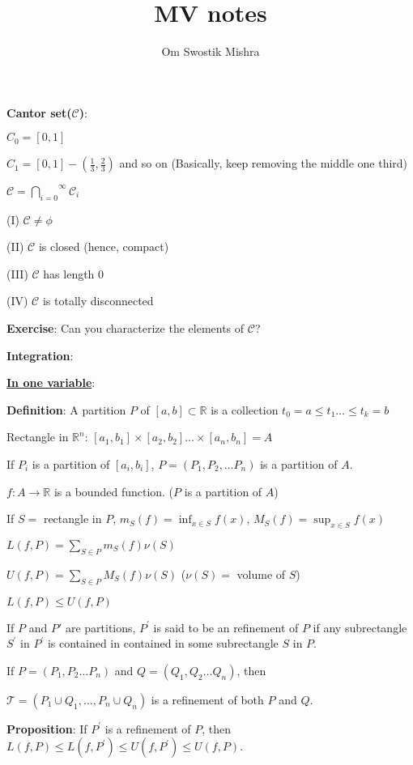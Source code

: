 \documentclass{article}
\title{MV notes}
\author{Om Swostik Mishra}
\date{}
\begin{document}
\maketitle

\begin{flushleft}
\textbf{Cantor set($\mathscr{C}$)}:     

$C_0=[0,1]$

$C_1=[0,1]-(\frac{1}{3},\frac{2}{3})$ and so on (Basically, keep removing the middle one third)

$\mathscr{C}=\overset{\infty}{\underset{i=0}{\bigcap}} \mathcal{C}_i$

(I) $\mathscr{C}\neq \phi$

(II) $\mathscr{C}$ is closed (hence, compact)

(III) $\mathscr{C}$ has length 0

(IV) $\mathscr{C}$ is totally disconnected

\textbf{Exercise}: Can you characterize the elements of $\mathscr{C}$?

\textbf{Integration}:

\underline{\textbf{In one variable}}:

\textbf{Definition}: A partition $P$ of $[a,b]\subset\mathds{R}$ is a collection $t_0=a\leq t_1\dots \leq t_k=b$

Rectangle in $\mathds{R}^n$: $[a_1,b_1]\times [a_2,b_2]\dots \times[a_n,b_n]=A$

If $P_i$ is a partition of $[a_i,b_i]$, $P=(P_1,P_2,\dots P_n)$ is a partition of $A$.

$f:A\rightarrow \mathds{R}$ is a bounded function. ($P$ is a partition of $A$)

If $S=$ rectangle in $P$, $m_S(f)=\inf_{x\in S} f(x)$, $M_S(f)=\sup_{x\in S} f(x)$

$L(f,P)=\sum_{S\in P}^{} m_S(f)\nu(S)$

$U(f,P)=\sum_{S\in P}^{} M_S(f)\nu(S)$  ($\nu(S)=$ volume of $S$)

$L(f,P)\leq U(f,P)$ 

If $P$ and $P{'}$ are partitions, $P^{'}$ is said to be an refinement of $P$ if any subrectangle $S^{'}$ in $P^{'}$ is contained in contained in some subrectangle $S$ in $P$.

If $P=(P_1,P_2\dots P_n)$ and $Q=(Q_1,Q_2\dots Q_n)$, then

$\mathcal{T}=(P_1\cup Q_1,\dots ,P_n\cup Q_n)$ is a refinement of both $P$ and $Q$.

\textbf{Proposition}: If $P^{'}$ is a refinement of $P$, then $L(f,P)\leq L(f,P^{'})\leq U(f,P^{'})\leq U(f,P)$.


\end{flushleft}
\end{document}

